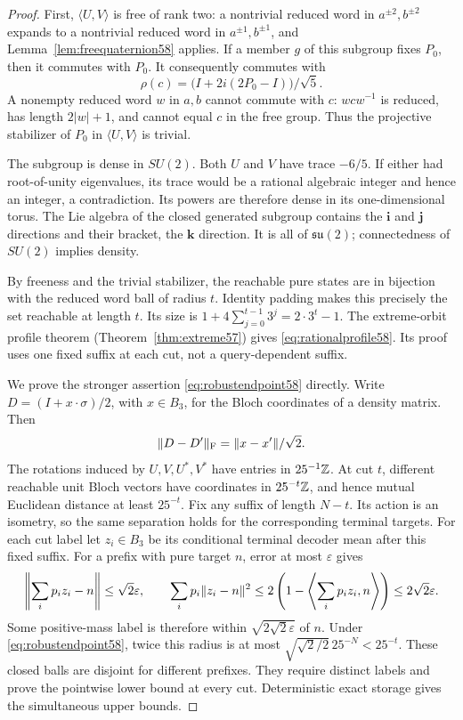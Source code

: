 \begin{proof}
First, $\langle U,V\rangle$ is free of rank two: a nontrivial reduced
word in $a^{\pm2},b^{\pm2}$ expands to a nontrivial reduced word in
$a^{\pm1},b^{\pm1}$, and Lemma~\ref{lem:freequaternion58} applies.
If a member $g$ of this subgroup fixes $P_0$, then it commutes with $P_0$.
It consequently commutes with
\[
             \rho(c)=\bigl(I+2i(2P_0-I)\bigr)/\sqrt5.
\]
A nonempty reduced word $w$ in $a,b$ cannot commute with $c$:
$wcw^{-1}$ is reduced, has length $2|w|+1$, and cannot equal $c$ in the
free group. Thus the projective stabilizer of $P_0$ in $\langle U,V\rangle$
is trivial.

The subgroup is dense in $SU(2)$. Both $U$ and $V$ have trace $-6/5$.
If either had root-of-unity eigenvalues, its trace would be a rational
algebraic integer and hence an integer, a contradiction. Its powers are
therefore dense in its one-dimensional torus. The Lie algebra of the
closed generated subgroup contains the $\mathbf i$ and $\mathbf j$
directions and their bracket, the $\mathbf k$ direction. It is all of
$\mathfrak{su}(2)$; connectedness of $SU(2)$ implies density.

By freeness and the trivial stabilizer, the reachable pure states are in
bijection with the reduced word ball of radius $t$. Identity padding
makes this precisely the set reachable at length $t$. Its size is
$1+4\sum_{j=0}^{t-1}3^j=2\cdot3^t-1$. The extreme-orbit profile theorem
(Theorem~\ref{thm:extreme57}) gives \eqref{eq:rationalprofile58}. Its proof
uses one fixed suffix at each cut, not a query-dependent suffix.

We prove the stronger assertion \eqref{eq:robustendpoint58} directly.
Write $D=(I+x\cdot\sigma)/2$, with $x\in B_3$, for the Bloch coordinates
of a density matrix. Then
\begin{equation}\label{eq:blochnorm58}
                  \lVert D-D'\rVert_{\mathrm F}=\lVert x-x'\rVert/\sqrt2.
\end{equation}
The rotations induced by $U,V,U^*,V^*$ have entries in
$25^{-1}\mathbb Z$. At cut $t$, different reachable unit Bloch vectors have
coordinates in $25^{-t}\mathbb Z$, and hence mutual Euclidean distance at least
$25^{-t}$. Fix any suffix of length $N-t$. Its action is an isometry, so
the same separation holds for the corresponding terminal targets.
For each cut label let $z_i\in B_3$ be its conditional terminal decoder
mean after this fixed suffix. For a prefix with pure target $n$, error
at most $\varepsilon$ gives
\[
 \left\|\sum_i p_i z_i-n\right\|\le\sqrt2\varepsilon,
 \qquad
 \sum_i p_i\lVert z_i-n\rVert^2
       \le2\left(1-\left\langle\sum_i p_i z_i,n\right\rangle\right)
       \le2\sqrt2\varepsilon.
\]
Some positive-mass label is therefore within
$\sqrt{2\sqrt2\varepsilon}$ of $n$. Under \eqref{eq:robustendpoint58},
twice this radius is at most
$\sqrt{\sqrt2/2}\,25^{-N}<25^{-t}$. These closed balls are disjoint
for different prefixes. They require distinct labels and prove the
pointwise lower bound at every cut. Deterministic exact storage gives
the simultaneous upper bounds.


\end{proof}
